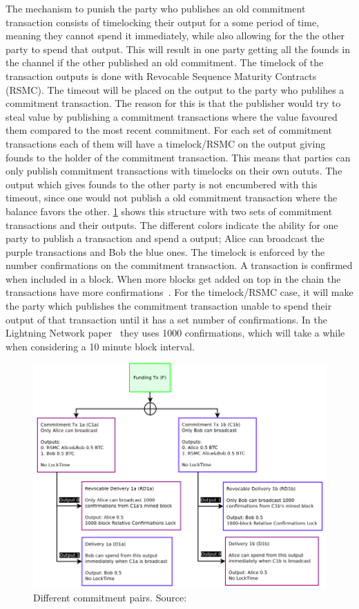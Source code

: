 The mechanism to punish the party who publishes an old commitment transaction consists of timelocking their output for a some period of time, meaning they cannot spend it immediately, while also allowing for the the other party to spend that output. 
This will result in one party getting all the founds in the channel if the other published an old commitment. The timelock of the transaction outputs is done with Revocable Sequence Maturity Contracts (RSMC). 
The timeout will be placed on the output to the party who publihes a commitment transaction. The reason for this is that the publisher would try to steal value by publishing a commitment transactions where the value favoured them compared to the most recent commitment. 
For each set of commitment transactions each of them will have a timelock/RSMC on the output giving founds to the holder of the commitment transaction. This means that parties can only publish commitment transactions with timelocks on their own oututs.
The output which gives founds to the other party is not encumbered with this timeout, since one would not publish a old commitment transaction where the balance favors the other. 
\cref{fig:ln_timeout} shows this structure with two sets of commitment transactions and their outputs. The different colors indicate the ability for one party to publish a transaction and spend a output; Alice can broadcast the purple transactions and Bob the blue ones. The timelock is enforced by the number confirmations on the commitment transaction. A transaction is confirmed when included in a block. When more blocks get added on top in the chain the transactions have more confirmations~\cite{antonopoulos2017mastering}. For the timelock/RSMC case, it will make the party which publishes the commitment transaction unable to spend their output of that transaction until it has a set number of confirmations. In the Lightning Network paper~\cite{poon2015bitcoin} they uses 1000 confirmations, which will take a while when considering a 10 minute block interval.
\\

\begin{figure}[ht]
    \centering
    \includegraphics[width=12cm]{figures/ln_timeout.png}
    \caption{Different commitment pairs. Source: \cite{poon2015bitcoin}}
    \label{fig:ln_timeout}
\end{figure}

